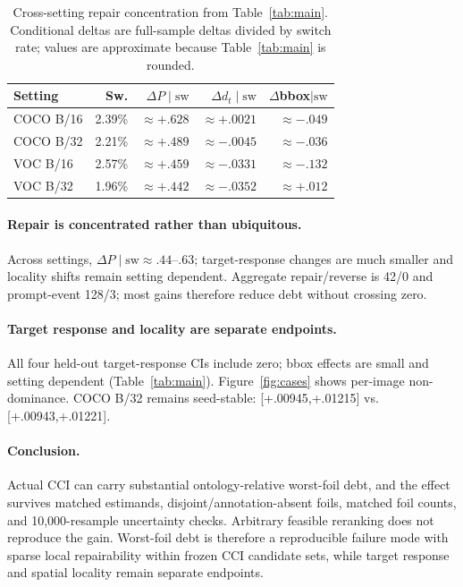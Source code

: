 \documentclass[10pt]{article}
\begin{document}
\begin{table}[!h]
\centering
\caption{Cross-setting repair concentration from Table~\ref{tab:main}. Conditional deltas are full-sample deltas divided by switch rate; values are approximate because Table~\ref{tab:main} is rounded.}
\label{tab:repair_accounting}
\small
\setlength{\tabcolsep}{1.7pt}
\renewcommand{\arraystretch}{0.94}
\begin{tabular}{lrrrr}
\toprule
Setting & Sw. & $\Delta P\mid\mathrm{sw}$ & $\Delta d_t\mid\mathrm{sw}$ & $\Delta$bbox$\mid\mathrm{sw}$\\
\midrule
COCO B/16 & 2.39\% & $\approx+.628$ & $\approx+.0021$ & $\approx-.049$\\
COCO B/32 & 2.21\% & $\approx+.489$ & $\approx-.0045$ & $\approx-.036$\\
VOC B/16  & 2.57\% & $\approx+.459$ & $\approx-.0331$ & $\approx-.132$\\
VOC B/32  & 1.96\% & $\approx+.442$ & $\approx-.0352$ & $\approx+.012$\\
\bottomrule
\end{tabular}
\end{table}

\paragraph{Repair is concentrated rather than ubiquitous.}
Across settings, $\Delta P\mid\mathrm{sw}\approx .44$--$.63$; target-response changes are much smaller and locality shifts remain setting dependent. Aggregate repair/reverse is 42/0 and prompt-event 128/3; most gains therefore reduce debt without crossing zero.

\paragraph{Target response and locality are separate endpoints.}
All four held-out target-response CIs include zero; bbox effects are small and
setting dependent (Table~\ref{tab:main}). Figure~\ref{fig:cases} shows per-image
non-dominance. COCO B/32 remains seed-stable: [+.00945,+.01215] vs. [+.00943,+.01221].
\paragraph{Conclusion.}
Actual CCI can carry substantial ontology-relative worst-foil debt, and the
effect survives matched estimands, disjoint/annotation-absent foils, matched foil
counts, and 10,000-resample uncertainty checks. Arbitrary feasible reranking does
not reproduce the gain. Worst-foil debt is therefore a reproducible failure mode
with sparse local repairability within frozen CCI candidate sets, while target
response and spatial locality remain separate endpoints.
\end{document}
